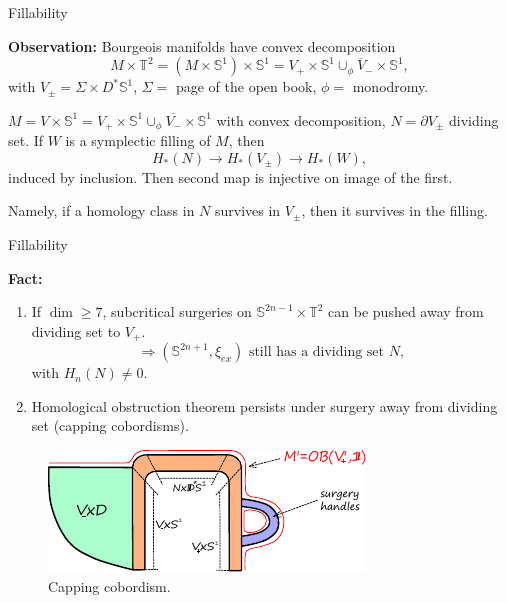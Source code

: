 \documentclass{beamer}
\begin{document}
\begin{frame}{Fillability}

\textbf{Observation:} Bourgeois manifolds have convex decomposition $$M\times \mathbb T^2=(M\times \mathbb S^1)\times \mathbb S^1= V_+\times \mathbb S^1 \cup_\phi \overline{V}_-\times \mathbb S^1,$$ with $V_\pm=\Sigma \times D^*\mathbb S^1$, $\Sigma=$ page of the open book, $\phi=$ monodromy.

\pause

\begin{theorem}

$M=V\times \mathbb S^1=V_+\times \mathbb S^1\cup_\phi \overline{V_-}\times \mathbb S^1$ with convex decomposition, $N=\partial V_\pm$ dividing set. If $W$ is a symplectic filling of $M$, then
$$
H_*(N)\rightarrow H_*(V_\pm) \rightarrow H_*(W),
$$
induced by inclusion. Then second map is injective on image of the first.
\end{theorem}

Namely, if a homology class in $N$ survives in $V_\pm$, then it survives in the filling.
    
\end{frame}

\begin{frame}{Fillability}

\textbf{Fact:} 

\begin{enumerate}
    \item If $\dim \geq 7$, subcritical surgeries on $\mathbb S^{2n-1}\times \mathbb T^2$ can be pushed away from dividing set to $V_+$.
$$
\Rightarrow (\mathbb S^{2n+1},\xi_{ex}) \mbox{ still has a dividing set } N,
$$
with $H_n(N)\neq 0$.

\pause 
\item Homological obstruction theorem persists under surgery away from dividing set (capping cobordisms).
\end{enumerate}


\begin{figure}
    \centering
    \includegraphics[width=0.68\linewidth]{blowdown_handle.pdf}
    \caption{Capping cobordism.}
    \label{fig:capping_cobordism}
\end{figure}

\end{frame}
\end{document}
